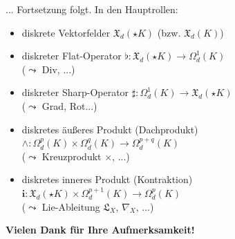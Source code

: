 \documentclass{beamer}
\begin{document}
  \begin{frame}
    \begin{block}{... Fortsetzung folgt.}
      \pause
      In den Hauptrollen:
      \begin{itemize}
        \item diskrete Vektorfelder \( \mathfrak{X}_{d}(\star K)  \) (bzw. \( \mathfrak{X}_{d}(K)  \))
        \pause
        \item diskreter Flat-Operator \( \flat: \mathfrak{X}_{d}(\star K) \longrightarrow \Omega_{d}^{1}(K) \) \\
              (\( \leadsto  \) Div, ...)
        \pause
        \item diskreter Sharp-Operator \( \sharp: \Omega_{d}^{1}(K) \longrightarrow \mathfrak{X}_{d}(\star K)\) \\
              (\( \leadsto  \) Grad, Rot...)
        \pause
        \item diskretes äußeres Produkt (Dachprodukt) \( \wedge: \Omega_{d}^{p}(K)\times\Omega_{d}^{q}(K) \longrightarrow  \Omega_{d}^{p+q}(K) \) \\
              (\( \leadsto  \) Kreuzprodukt \( \times \), ...)
        \pause
        \item diskretes inneres Produkt (Kontraktion) \( \mathbf{i}: \mathfrak{X}_{d}(\star K) \times \Omega_{d}^{p+1}(K) \longrightarrow \Omega_{d}^{p}(K)\) \\
              (\( \leadsto  \) Lie-Ableitung \( \mathfrak{L}_{X} \), \( \nabla_{X} \), ...)
      \end{itemize}
    \end{block}

    \pause
    \begin{block}{}
      \centering \large \textbf{Vielen Dank für Ihre Aufmerksamkeit!}
    \end{block}
  \end{frame}
\end{document}

